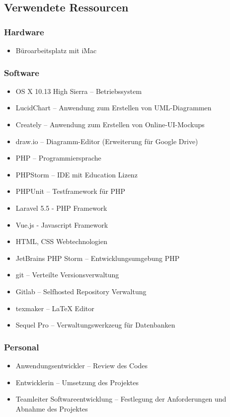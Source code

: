 \subsection{Verwendete Ressourcen}
\label{app:Ressourcen}

\subsubsection{Hardware}
\begin{itemize}
	\item Büroarbeitsplatz mit iMac
\end{itemize}

\subsubsection{Software}
\begin{itemize}
	\item OS X 10.13 High Sierra – Betriebssystem
	\item LucidChart – Anwendung zum Erstellen von \acs{UML}-Diagrammen
	\item Creately – Anwendung zum Erstellen von Online-UI-Mockups
	\item draw.io – Diagramm-Editor (Erweiterung für Google Drive)
	\item PHP – Programmiersprache
	\item PHPStorm – IDE mit Education Lizenz
	\item PHPUnit – Testframework für PHP
	\item Laravel 5.5 - \acs{PHP} Framework
	\item Vue.js - Javascript Framework
	\item \acs{HTML}, \acs{CSS} Webtechnologien
	\item JetBrains PHP Storm – Entwicklungsumgebung \acs{PHP}
	\item git – Verteilte Versionsverwaltung
	\item Gitlab – Selfhosted Repository Verwaltung
	\item texmaker – \LaTeX\xspace Editor
	\item Sequel Pro – Verwaltungswerkzeug für Datenbanken
\end{itemize}

\subsubsection{Personal}
\begin{itemize}
	\item Anwendungsentwickler – Review des Codes
	\item Entwicklerin – Umsetzung des Projektes
	\item Teamleiter Softwareentwicklung – Festlegung der Anforderungen und Abnahme des Projektes
\end{itemize}